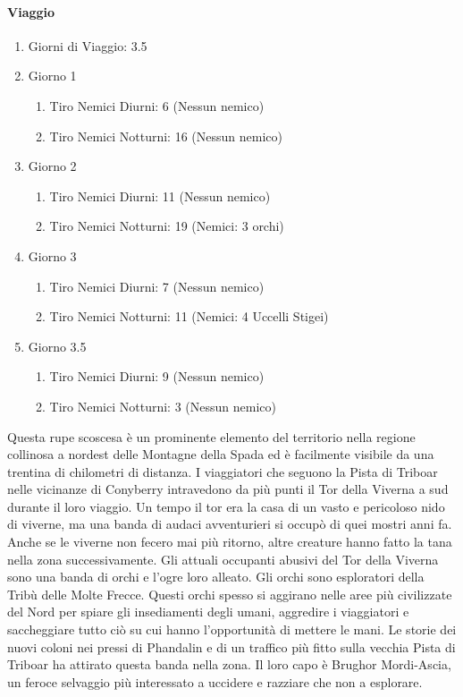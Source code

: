 \documentclass{article}
\begin{document}
 \paragraph{Viaggio} \begin{enumerate}
        \item Giorni di Viaggio: 3.5
        \item Giorno 1
                \begin{enumerate}
                    \item Tiro Nemici Diurni: 6 (Nessun nemico)
                    \item Tiro Nemici Notturni: 16 (Nessun nemico)
                \end{enumerate}
         \item Giorno 2
                \begin{enumerate}
                    \item Tiro Nemici Diurni: 11 (Nessun nemico)
                    \item Tiro Nemici Notturni: 19 (Nemici: 3 orchi)
                \end{enumerate}
         \item Giorno 3
                \begin{enumerate}
                    \item Tiro Nemici Diurni: 7 (Nessun nemico)
                    \item Tiro Nemici Notturni: 11 (Nemici: 4 Uccelli Stigei)
                \end{enumerate}
         \item Giorno 3.5
                \begin{enumerate}
                    \item Tiro Nemici Diurni: 9 (Nessun nemico)
                    \item Tiro Nemici Notturni: 3 (Nessun nemico)
                \end{enumerate}
    \end{enumerate}
Questa rupe scoscesa è un prominente elemento del territorio
nella regione collinosa a nordest delle Montagne della Spada
ed è facilmente visibile da una trentina di chilometri di
distanza. I viaggiatori che seguono la Pista di Triboar nelle
vicinanze di Conyberry intravedono da più punti il Tor della
Viverna a sud durante il loro viaggio. Un tempo il tor era la
casa di un vasto e pericoloso nido di viverne, ma una banda
di audaci avventurieri si occupò di quei mostri anni fa. Anche
se le viverne non fecero mai più ritorno, altre creature hanno
fatto la tana nella zona successivamente. Gli attuali occupanti
abusivi del Tor della Viverna sono una banda di orchi e l’ogre
loro alleato.
Gli orchi sono esploratori della Tribù delle Molte Frecce.
Questi orchi spesso si aggirano nelle aree più civilizzate del
Nord per spiare gli insediamenti degli umani, aggredire i
viaggiatori e saccheggiare tutto ciò su cui hanno l'opportunità
di mettere le mani. Le storie dei nuovi coloni nei pressi di
Phandalin e di un traffico più fitto sulla vecchia Pista di
Triboar ha attirato questa banda nella zona. Il loro capo è
Brughor Mordi-Ascia, un feroce selvaggio più interessato a
uccidere e razziare che non a esplorare.
\end{document}
